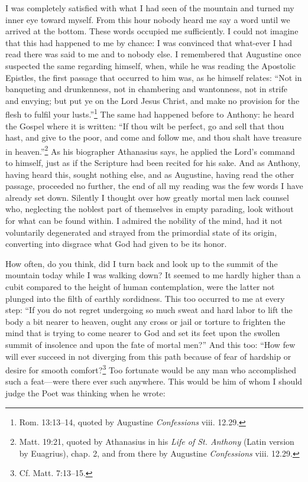 I was completely satisfied with what I had seen of the mountain and
turned my inner eye toward myself. From this hour nobody heard me say
a word until we arrived at the bottom. These words occupied me
sufficiently. I could not imagine that this had happened to me by
chance: I was convinced that what-ever I had read there was
said to me and to nobody else. I remembered that Augustine once
suspected the same regarding himself, when, while he was reading the
Apostolic Epistles, the first passage that occurred to him was, as he
himself relates: ``Not in banqueting and drunkenness, not in
chambering and wantonness, not in strife and envying; but put ye on
the Lord Jesus Christ, and make no provision for the flesh to fulfil
your lusts.''\footnote{Rom. 13:13--14, quoted by Augustine
\textit{Confessions} viii. 12.29.} The same had happened before to
Anthony: he heard the Gospel where it is written: ``If thou wilt be
perfect, go and sell that thou hast, and give to the poor, and come
and follow me, and thou shalt have treasure in
heaven.''\footnote{Matt. 19:21, quoted by Athanasius in his
\textit{Life of St. Anthony} (Latin version by Euagrius), chap. 2, and
from there by Augustine \textit{Confessions} viii. 12.29.} As his
biographer Athanasius says, he applied the Lord's command to himself,
just as if the Scripture had been recited for his sake. And as
Anthony, having heard this, sought nothing else, and as Augustine,
having read the other passage, proceeded no further, the end of all my
reading was the few words I have already set down. Silently I thought
over how greatly mortal men lack counsel who, neglecting the noblest
part of themselves in empty parading, look without for what can be
found within. I admired the nobility of the mind, had it not
voluntarily degenerated and strayed from the primordial state of its
origin, converting into disgrace what God had given to be its honor.

How often, do you think, did I turn back and look up to the summit of
the mountain today while I was walking down? It seemed to me hardly
higher than a cubit compared to the height of human contemplation,
were the latter not plunged into the filth of earthly sordidness. This
too occurred to me at every step: ``If you do not regret undergoing so
much sweat and hard labor to lift the body a bit nearer to heaven,
ought any cross or jail or torture to frighten the mind that is trying
to come nearer to God and set its feet upon the swollen summit of
insolence  and upon the fate of mortal men?'' And this too:
``How few will ever succeed in not diverging from this path because of
fear of hardship or desire for smooth comfort?\footnote{Cf. Matt.
7:13--15.} Too fortunate would be any man who accomplished such a
feat---were there ever such anywhere. This would be him of whom I
should judge the Poet was thinking when he wrote:

